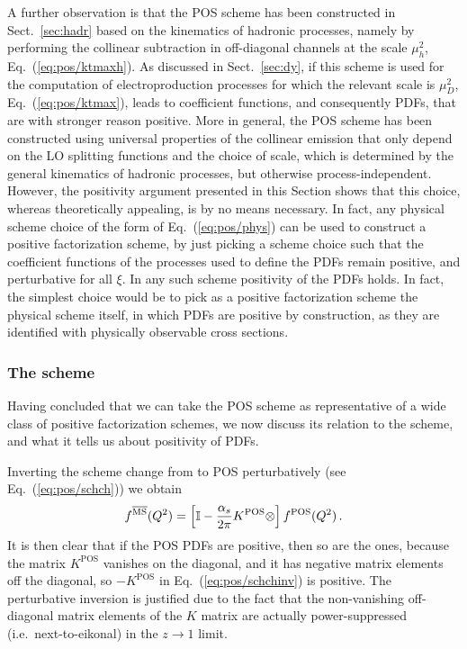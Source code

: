 A further observation is that the POS
scheme has been constructed in Sect.~\ref{sec:hadr} based on the kinematics of hadronic processes,
namely by performing the collinear subtraction in off-diagonal
channels at the scale  $\mu_h^2$,
Eq.~(\ref{eq:pos/ktmaxh}). As discussed in Sect.~\ref{sec:dy}, if this
scheme is used for the computation of electroproduction processes for
which the relevant scale is $\mu_D^2$, Eq.~(\ref{eq:pos/ktmax}), leads
to coefficient functions, and consequently PDFs, that are with stronger
reason positive. More in general, the POS scheme has been constructed
using universal properties of the collinear emission that only
depend on the LO splitting functions and the choice of scale, which is
determined by the general kinematics of hadronic processes, but
otherwise process-independent. However, the positivity argument
presented in this Section shows that this choice, whereas theoretically
appealing, is by no means necessary. In fact, any physical scheme
choice of the form of Eq.~(\ref{eq:pos/phys}) can be used to construct a
positive factorization scheme, by just picking a scheme choice such
that the coefficient functions of the processes used to define the
PDFs remain positive, and perturbative for all $\xi$.
In any such scheme positivity of the PDFs
holds. In fact, the simplest choice would be to pick as a
positive factorization scheme the physical scheme itself, in which
PDFs are positive by construction, as they are identified with
physically observable cross sections.

\subsubsection{The \msbar{} scheme}
\label{sec:posmsbar}


Having concluded that we can take the POS scheme as representative of
a wide class of positive factorization schemes, we now discuss 
its relation to the \msbar{} scheme, and what it
tells us about positivity of \msbar{} PDFs.

Inverting the scheme change from \msbar{} to POS perturbatively (see Eq.~(\ref{eq:pos/schch}))
we obtain
\begin{equation}
  \label{eq:pos/schchinv}
 f^{{\overline{\textrm{MS}}}}(Q^2)=\left[\mathbb{I}
  -\frac{\alpha_s}{2\pi}  K^{\textrm{POS}}\otimes \right]  f^{\textrm{POS}}(Q^2) \,.
\end{equation}
It is then clear that if the POS PDFs are positive, then so are the
\msbar{} ones, because the matrix $K^{\textrm{POS}}$ vanishes on the
diagonal, and it has negative matrix elements off the diagonal, so
$-K^{\textrm{POS}}$ in Eq.~(\ref{eq:pos/schchinv}) is positive.
The perturbative inversion is justified due to the fact that the
non-vanishing off-diagonal matrix elements of the $K$ matrix are
actually power-suppressed (i.e.\ next-to-eikonal) in the $z\to 1$
limit.

